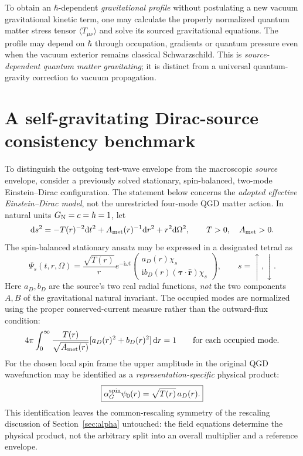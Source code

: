 \documentclass[11pt,a4paper,oneside]{report}
\numberwithin{equation}{chapter}
\theoremstyle{definition}\newtheorem{definition}[theorem]{Definition}
\theoremstyle{remark}\newtheorem{remark}[theorem]{Remark}
\newcommand{\ii}{\mathrm i}
\begin{document}
To obtain an $\hbar$-dependent \emph{gravitational profile} without postulating a new vacuum gravitational kinetic term, one may calculate the properly normalized quantum matter stress tensor $\langle T_{\mu\nu}\rangle$ and solve its sourced gravitational equations. The profile may depend on $\hbar$ through occupation, gradients or quantum pressure even when the vacuum exterior remains classical Schwarzschild. This is \emph{source-dependent quantum matter gravitating}; it is distinct from a universal quantum-gravity correction to vacuum propagation.


\section{A self-gravitating Dirac-source consistency benchmark}\label{sec:sourcebenchmark}
To distinguish the outgoing test-wave envelope from the macroscopic
\emph{source} envelope, consider a previously solved stationary,
spin-balanced, two-mode Einstein--Dirac configuration.  The statement
below concerns the \emph{adopted effective Einstein--Dirac model}, not
the unrestricted four-mode QGD matter action.
In natural units $G_{\rm N}=c=\hbar=1$, let
\begin{equation}
 \mathrm ds^2=-T(r)^{-2}\mathrm dt^2
    +A_{\rm met}(r)^{-1}\mathrm dr^2+r^2\mathrm d\Omega^2,
 \qquad T>0,\quad A_{\rm met}>0.
 \label{eq:sourceMetric}
\end{equation}
The spin-balanced stationary ansatz may be expressed in a designated
tetrad as
\begin{equation}
 \Psi_s(t,r,\Omega)=\frac{\sqrt{T(r)}}r e^{-\ii\omega t}
 \begin{pmatrix}a_D(r)\chi_s\\[2pt]
 \ii b_D(r)(\bm\tau\cdot\widehat{\bm r})\chi_s\end{pmatrix},
 \qquad s=\uparrow,\downarrow.
 \label{eq:sourceSpinors}
\end{equation}
Here $a_D,b_D$ are the source's two real radial functions, \emph{not}
the two components $A,B$ of the gravitational natural invariant.
The occupied modes are normalized using the proper conserved-current
measure rather than the outward-flux condition:
\begin{equation}
 4\pi\int_0^\infty
 \frac{T(r)}{\sqrt{A_{\rm met}(r)}}
 [a_D(r)^2+b_D(r)^2]\,\mathrm dr=1
 \qquad\text{for each occupied mode}.
 \label{eq:sourceNorm}
\end{equation}
For the chosen local spin frame the upper amplitude in the original QGD
wavefunction may be identified as a \emph{representation-specific}
physical product:
\begin{equation}
 \boxed{\alpha_G^{\rm spin}\psi_0(r)=\sqrt{T(r)}\,a_D(r).}
 \label{eq:sourceUpper}
\end{equation}
This identification leaves the common-rescaling symmetry of
the rescaling discussion of Section~\ref{sec:alpha} untouched: the field equations determine the
physical product, not the arbitrary split into an overall multiplier
and a reference envelope.
\end{document}

